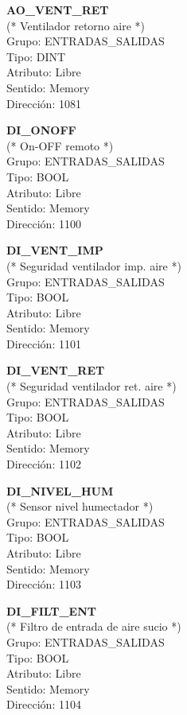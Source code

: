 \textbf{AO\_VENT\_RET}\\(* Ventilador retorno aire *)\\Grupo: ENTRADAS\_SALIDAS\\Tipo: DINT\\Atributo: Libre\\Sentido: Memory\\Dirección: 1081

\vspace{10mm}

\textbf{DI\_ONOFF}\\(* On-OFF remoto *)\\Grupo: ENTRADAS\_SALIDAS\\Tipo: BOOL\\Atributo: Libre\\Sentido: Memory\\Dirección: 1100

\vspace{10mm}

\textbf{DI\_VENT\_IMP}\\(* Seguridad ventilador imp. aire *)\\Grupo: ENTRADAS\_SALIDAS\\Tipo: BOOL\\Atributo: Libre\\Sentido: Memory\\Dirección: 1101

\vspace{10mm}

\textbf{DI\_VENT\_RET}\\(* Seguridad ventilador ret. aire *)\\Grupo: ENTRADAS\_SALIDAS\\Tipo: BOOL\\Atributo: Libre\\Sentido: Memory\\Dirección: 1102

\vspace{10mm}

\textbf{DI\_NIVEL\_HUM}\\(* Sensor nivel humectador *)\\Grupo: ENTRADAS\_SALIDAS\\Tipo: BOOL\\Atributo: Libre\\Sentido: Memory\\Dirección: 1103

\vspace{10mm}

\textbf{DI\_FILT\_ENT}\\(* Filtro de entrada de aire sucio *)\\Grupo: ENTRADAS\_SALIDAS\\Tipo: BOOL\\Atributo: Libre\\Sentido: Memory\\Dirección: 1104

